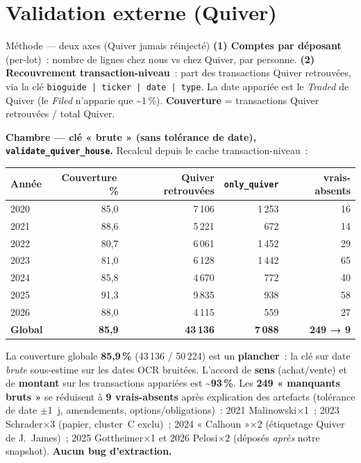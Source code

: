 \documentclass[11pt,a4paper]{article}
\newcommand{\co}[1]{\texttt{\small #1}}
\begin{document}
\section{Validation externe (Quiver)}
\label{sec:quiver}

\begin{defbox}{Méthode — deux axes (Quiver jamais réinjecté)}
\textbf{(1) Comptes par déposant} (per-lot)~: nombre de lignes chez nous vs chez Quiver, par personne.
\textbf{(2) Recouvrement transaction-niveau}~: part des transactions Quiver retrouvées, via la clé
\co{bioguide | ticker | date | type}. La date appariée est le \emph{Traded} de Quiver (le \emph{Filed}
n'apparie que \textasciitilde 1\,\%). \textbf{Couverture} = transactions Quiver retrouvées / total Quiver.
\end{defbox}

\textbf{Chambre — clé « brute » (sans tolérance de date), \co{validate_quiver_house}.} Recalcul depuis
le cache transaction-niveau~:
\begin{center}\small
\begin{tabular}{l rrrr}
\toprule
\bfseries Année & \bfseries Couverture\,\% & \bfseries Quiver retrouvées & \bfseries \co{only_quiver} & \bfseries vrais-absents\\
\midrule
2020 & 85,0 & 7\,106 & 1\,253 & 16 \\
2021 & 88,6 & 5\,221 & 672 & 14 \\
2022 & 80,7 & 6\,061 & 1\,452 & 29 \\
2023 & 81,0 & 6\,128 & 1\,442 & 65 \\
2024 & 85,8 & 4\,670 & 772 & 40 \\
2025 & 91,3 & 9\,835 & 938 & 58 \\
2026 & 88,0 & 4\,115 & 559 & 27 \\
\midrule
\textbf{Global} & \textbf{85,9} & \textbf{43\,136} & \textbf{7\,088} & \textbf{249 → 9} \\
\bottomrule
\end{tabular}
\end{center}
La couverture globale \textbf{85,9\,\%} (43\,136 / 50\,224) est un \textbf{plancher}~: la clé sur date
\emph{brute} sous-estime sur les dates OCR bruitées. L'accord de \textbf{sens} (achat/vente) et de
\textbf{montant} sur les transactions appariées est \textbf{\textasciitilde 93\,\%}. Les
\textbf{249 « manquants bruts »} se réduisent à \textbf{9 vrais-absents} après explication des
artefacts (tolérance de date $\pm$1~j, amendements, options/obligations)~: 2021 Malinowski$\times$1~;
2023 Schrader$\times$3 (papier, cluster~C exclu)~; 2024 « Calhoun »$\times$2 (étiquetage Quiver de
J.~James)~; 2025 Gottheimer$\times$1 et 2026 Pelosi$\times$2 (déposés \emph{après} notre snapshot).
\textbf{Aucun bug d'extraction.}
\end{document}
